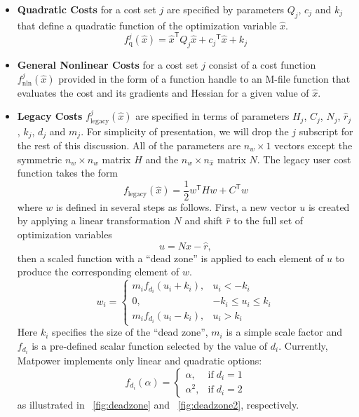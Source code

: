 \documentclass[12pt]{article}
\newcommand{\matpower}[0]{{\sc Matpower}}
\newcommand{\trans}[1]{{#1}^{\ensuremath{\mathsf{T}}}}  %
\numberwithin{equation}{section}
\numberwithin{table}{section}
\numberwithin{figure}{section}
\begin{document}
\begin{itemize}
\item {\bf Quadratic Costs} for a cost set $j$ are specified by parameters $Q_j$, $c_j$ and $k_j$ that define a quadratic function of the optimization variable $\hat{x}$.
\begin{equation}
f^j_\mathrm{q}(\hat{x}) = \trans{\hat{x}} Q_j \hat{x} + \trans{c_j} \hat{x} + k_j
\label{eq:quad_cost}
\end{equation}

\item {\bf General Nonlinear Costs} for a cost set $j$ consist of a cost function $f^j_\mathrm{nln}(\hat{x})$ provided in the form of a function handle to an M-file function that evaluates the cost and its gradients and Hessian for a given value of $\hat{x}$.

\item {\bf Legacy Costs} $f^j_\mathrm{legacy}(\hat{x})$ are specified in terms of parameters $H_j$, $C_j$, $N_j$, $\hat{r}_j$, $k_j$, $d_j$ and $m_j$. For simplicity of presentation, we will drop the $j$ subscript for the rest of this discussion. All of the parameters are $n_w \times 1$ vectors except the symmetric $n_w \times n_w$ matrix $H$ and the $n_w \times n_{\hat{x}}$ matrix $N$. The legacy user cost function takes the form
\begin{equation}
f_\mathrm{legacy}(\hat{x}) = \frac{1}{2} \trans{w} H w + \trans{C} w
\label{eq:flegacy}
\end{equation}
where $w$ is defined in several steps as follows. First, a new vector $u$ is created by applying a linear transformation $N$ and shift $\hat{r}$ to the full set of optimization variables
\begin{equation}
u = N \hat{x} - \hat{r},
\label{eq:u}
\end{equation}
then a scaled function with a ``dead zone'' is applied to each element of $u$ to produce the corresponding element of $w$.
\begin{equation}
w_i =
	\left\{
		\begin{array}{cc}
			m_i f_{d_i}(u_i + k_i), & u_i < -k_i 			\\
			0, 						& -k_i \le u_i \le k_i	\\
			m_i f_{d_i}(u_i - k_i), & u_i > k_i
		\end{array}
	\right.
\label{eq:w}
\end{equation}
Here $k_i$ specifies the size of the ``dead zone'', $m_i$ is a simple scale factor and $f_{d_i}$ is a pre-defined scalar function selected by the value of $d_i$. Currently, \matpower{} implements only linear and quadratic options:
\begin{equation}
f_{d_i}(\alpha) =
	\left\{
		\begin{array}{lc}
			\alpha,		& \mathrm{if } \; d_i = 1 \\
			\alpha^2,	& \mathrm{if } \; d_i = 2
		\end{array}
	\right.
\label{eq:fdi}
\end{equation}
as illustrated in \figurename~\ref{fig:deadzone} and \figurename~\ref{fig:deadzone2}, respectively.


\end{itemize}
\end{document}
